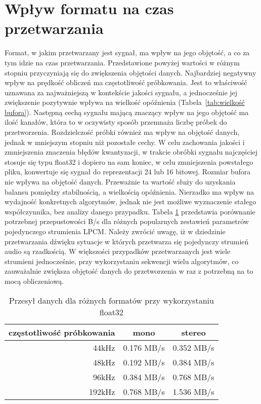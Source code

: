 \section{Wpływ formatu na czas przetwarzania}
Format, w jakim przetwarzany jest sygnał, ma wpływ na jego objętość, a co za tym idzie na czas przetwarzania. Przedstawione powyżej wartości w różnym stopniu przyczyniają się do zwiększenia objętości danych. Najbardziej negatywny wpływ na prędkość obliczeń ma częstotliwość próbkowania. Jest to właściwość uznawana za najważniejszą w kontekście jakości sygnału, a jednocześnie jej zwiększenie pozytywnie wpływa na wielkość opóźnienia (Tabela~\ref{tab:wielkość bufora}). Następną cechą sygnału mającą znaczący wpływ na jego objętość ma ilość kanałów, która to w oczywisty sposób przemnaża liczbę próbek do przetworzenia. Rozdzielczość próbki również ma wpływ na objętość danych, jednak w mniejszym stopniu niż pozostałe cechy. W celu zachowania jakości i zmniejszenia znaczenia błędów kwantyzacji, w trakcie obróbki sygnału najczęściej stosuje się typu float32 i dopiero na sam koniec, w celu zmniejszenia powstałego pliku, konwertuje się sygnał do reprezentacji 24 lub 16 bitowej. Rozmiar bufora nie wpływa na objętość danych. Przeważnie ta wartość służy do uzyskania balansu pomiędzy stabilnością, a wielkością opóźnienia. Nierzadko ma wpływ na wydajność konkretnych algorytmów, jednak nie jest możliwe wyznaczenie stałego współczynnika, bez analizy danego przypadku. Tabela \ref{tab:Przesył danych dla różnych formatów przy wykorzystaniu float32} przedstawia porównanie potrzebnej przepustowości B/s dla różnych popularnych zestawień parametrów pojedynczego strumienia LPCM. Należy zwrócić uwagę, iż w dziedzinie przetwarzania dźwięku sytuacje w których przetwarza się pojedynczy strumień audio są rzadkością. W większości przypadków przetwarzanych jest wiele strumieni jednocześnie, przy wykorzystaniu sekwencji wielu algorytmów, co zauważalnie zwiększa objętość danych do przetworzenia w raz z potrzebną na to mocą obliczeniową. 

\begin{table}[t]
    \begin{center}
        \caption{Przesył danych dla różnych formatów przy wykorzystaniu float32}
        \label{tab:Przesył danych dla różnych formatów przy wykorzystaniu float32}
        \begin{tabular}{r|c|c}
            częstotliwość próbkowania  &   mono      &   stereo \\
            \hline
            44kHz                      &   0.176 MB/s &  0.352 MB/s  \\
            48kHz                      &   0.192 MB/s &  0.384 MB/s  \\
            96kHz                      &   0.384 MB/s &  0.768 MB/s  \\
            192kHz                     &   0.768 MB/s & 1.536 MB/s  \\
        \end{tabular}
    \end{center}
\end{table}


